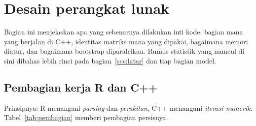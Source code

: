 \section{Desain perangkat lunak}\label{sec:desain}

Bagian ini menjelaskan apa yang sebenarnya dilakukan inti kode: bagian mana
yang berjalan di C++, identitas matriks mana yang dipakai, bagaimana memori
diatur, dan bagaimana bootstrap diparalelkan. Rumus statistik yang muncul di
sini dibahas lebih rinci pada bagian~\ref{sec:latar} dan tiap bagian model.

\subsection{Pembagian kerja R dan C++}\label{sec:pembagian-kerja}

Prinsipnya: R menangani \emph{parsing} dan \emph{perakitan}, C++ menangani
\emph{iterasi numerik}. Tabel~\ref{tab:pembagian} memberi pembagian persisnya.

